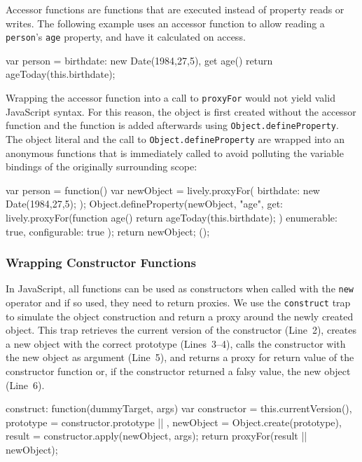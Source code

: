 Accessor functions are functions that are executed instead of property reads or writes.
The following example uses an accessor function to allow reading a \lstinline{person}'s \lstinline{age} property, and have it calculated on access.

\begin{code}
var person = {
    birthdate: new Date(1984,27,5),
    get age() {
        return ageToday(this.birthdate);
    }
}
\end{code}

Wrapping the accessor function into a call to \lstinline{proxyFor} would not yield valid JavaScript syntax.
For this reason, the object is first created without the accessor function and the function is added afterwards using \lstinline{Object.defineProperty}.
The object literal and the call to \lstinline{Object.defineProperty} are wrapped into an anonymous functions that is immediately called to avoid polluting the variable bindings of the originally surrounding scope:

\begin{code}
var person = function() {
    var newObject = lively.proxyFor({
        birthdate: new Date(1984,27,5);
    });
    Object.defineProperty(newObject, "age", {
        get: lively.proxyFor(function age() {
            return ageToday(this.birthdate);
        })
        enumerable: true,
        configurable: true
    });
    return newObject;
}();
\end{code}

\subsubsection{Wrapping Constructor Functions} 

In JavaScript, all functions can be used as constructors when called with the \lstinline{new} operator and if so used, they need to return proxies.
We use the \lstinline{construct} trap to simulate the object construction and return a proxy around the newly created object.
This trap retrieves the current version of the constructor (Line~2), creates a new object with the correct prototype (Lines~3--4), calls the constructor with the new object as argument (Line~5), and returns a proxy for return value of the constructor function or, if the constructor returned a falsy value, the new object (Line~6).
\begin{code}
construct: function(dummyTarget, args) {
    var constructor = this.currentVersion(),
        prototype = constructor.prototype || {},
        newObject = Object.create(prototype),
        result = constructor.apply(newObject, args);
    return proxyFor(result || newObject);
}
\end{code}

